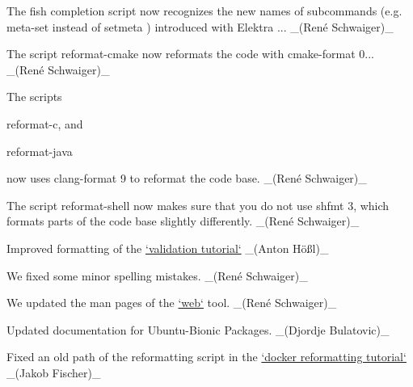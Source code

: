 \begin{DoxyItemize}
\item The fish completion script now recognizes the new names of subcommands (e.\+g. {\ttfamily meta-\/set} instead of {\ttfamily setmeta} ) introduced with Elektra {..}. \+\_\+(René Schwaiger)\+\_\+
\item The script reformat-\/cmake now reformats the code with {\ttfamily cmake-\/format} 0... \+\_\+(René Schwaiger)\+\_\+
\item The scripts
\begin{DoxyItemize}
\item reformat-\/c, and
\item reformat-\/java
\end{DoxyItemize}

now uses {\ttfamily clang-\/format} 9 to reformat the code base. \+\_\+(René Schwaiger)\+\_\+
\item The script reformat-\/shell now makes sure that you do not use {\ttfamily shfmt} 3, which formats parts of the code base slightly differently. \+\_\+(René Schwaiger)\+\_\+
\end{DoxyItemize}


\begin{DoxyItemize}
\item Improved formatting of the \hyperlink{doc_tutorials_validation_md}{`validation tutorial`} \+\_\+(Anton Hößl)\+\_\+
\item We fixed some minor spelling mistakes. \+\_\+(René Schwaiger)\+\_\+
\item We updated the man pages of the \hyperlink{doc_tutorials_install-webui_md}{`web`} tool. \+\_\+(René Schwaiger)\+\_\+
\item Updated documentation for Ubuntu-\/\+Bionic Packages. \+\_\+(\+Djordje Bulatovic)\+\_\+
\item Fixed an old path of the reformatting script in the \hyperlink{doc_tutorials_run_reformatting_script_with_docker_md}{`docker reformatting tutorial`} \+\_\+(\+Jakob Fischer)\+\_\+
\end{DoxyItemize}


